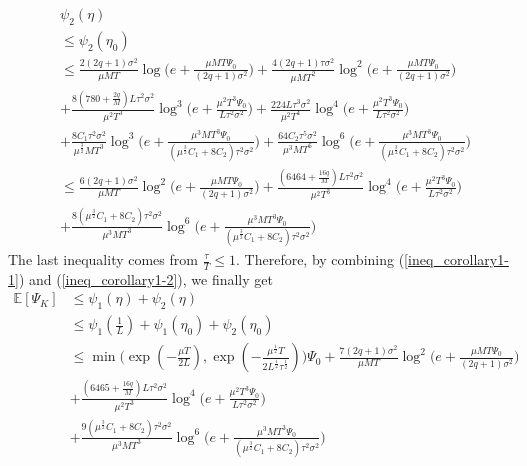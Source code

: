 \begin{align} \label{ineq_corollary1-2}
    &\psi_2(\eta) \nonumber\\
    &\leq \psi_2(\eta_0) \nonumber\\
    &\leq \frac{2(2q+1)\sigma^2}{\mu MT}\log\Big(e+\frac{\mu M T \Psi_0}{(2q+1)\sigma^2}\Big) + \frac{4(2q+1)\tau\sigma^2}{\mu MT^2} \log^2\Big(e+\frac{\mu M T \Psi_0}{(2q+1)\sigma^2}\Big) \nonumber\\
    &+ \frac{8(780+\frac{2q}{M})L\tau^2\sigma^2}{\mu^2 T^3} \log^3\Big(e+\frac{\mu^2 T^3\Psi_0}{L\tau^2\sigma^2}\Big) + \frac{224L\tau^3\sigma^2}{\mu^2 T^4}\log^4\Big(e+\frac{\mu^2 T^3\Psi_0}{L\tau^2\sigma^2}\Big) \nonumber\\
    &+ \frac{8C_1 \tau^2\sigma^2}{\mu^{\frac{3}{2}}MT^3}\log^3\Big(e+\frac{\mu^3 M T^3\Psi_0}{(\mu^{\frac{3}{2}}C_1+8C_2)\tau^2\sigma^2}\Big) + \frac{64C_2\tau^5\sigma^2}{\mu^3 MT^6} \log^6\Big(e+ \frac{\mu^3 M T^3\Psi_0}{(\mu^{\frac{3}{2}}C_1+8C_2)\tau^2\sigma^2}\Big) \nonumber\\
    &\leq \frac{6(2q+1)\sigma^2}{\mu MT}\log^2\Big(e+\frac{\mu M T \Psi_0}{(2q+1)\sigma^2}\Big) + \frac{(6464+\frac{16q}{M})L\tau^2\sigma^2}{\mu^2 T^3} \log^4\Big(e+\frac{\mu^2 T^3\Psi_0}{L\tau^2\sigma^2}\Big) \nonumber\\
    &+ \frac{8(\mu^{\frac{3}{2}}C_1+8C_2)\tau^2\sigma^2}{\mu^3 M T^3} \log^6 \Big(e + \frac{\mu^3 M T^3\Psi_0}{(\mu^{\frac{3}{2}}C_1+8C_2)\tau^2\sigma^2}\Big)
\end{align}
The last inequality comes from $\frac{\tau}{T} \leq 1$. Therefore, by combining (\ref{ineq_corollary1-1}) and (\ref{ineq_corollary1-2}), we finally get
\begin{align*}
    \mathbb{E}[\Psi_K] &\leq \psi_1(\eta) + \psi_2(\eta) \\
    &\leq \psi_1(\frac{1}{L}) + \psi_1(\eta_0) + \psi_2(\eta_0) \\
    &\leq \min \Big( \exp(-\frac{\mu T}{2L}), \exp(-\frac{\mu^{\frac{1}{2}}T}{2 L^{\frac{1}{2}}\tau^{\frac{1}{2}}})\Big) \Psi_0 + \frac{7(2q+1)\sigma^2}{\mu MT} \log^2 \Big(e+\frac{\mu M T \Psi_0}{(2q+1)\sigma^2}\Big) \\
        &+ \frac{(6465+\frac{16q}{M})L\tau^2\sigma^2}{\mu^2 T^3}\log^4 \Big(e+ \frac{\mu^2 T^3\Psi_0}{L\tau^2\sigma^2}\Big) \\
        &+ \frac{9(\mu^{\frac{3}{2}}C_1+8C_2)\tau^2\sigma^2}{\mu^3 M T^3} \log^6 \Big(e + \frac{\mu^3 M T^3\Psi_0}{(\mu^{\frac{3}{2}}C_1+8C_2)\tau^2\sigma^2}\Big)
\end{align*}

